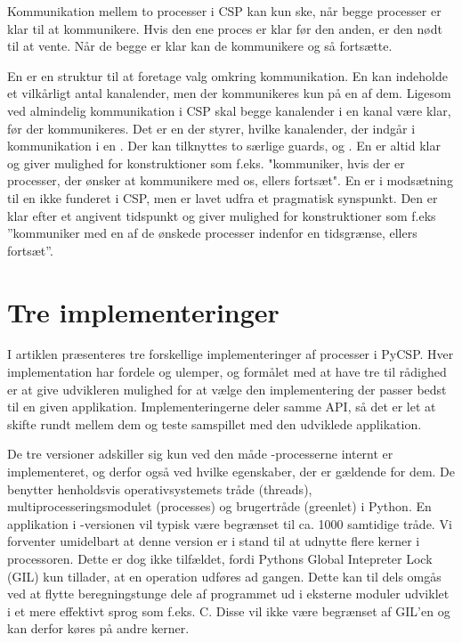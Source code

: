 Kommunikation mellem to processer i CSP kan kun ske, når begge processer er klar til at kommunikere. Hvis den ene proces er klar før den anden, er den nødt til at vente. Når de begge er klar kan de kommunikere og så fortsætte.

En  er en struktur til at foretage valg omkring kommunikation. En  kan indeholde et vilkårligt antal kanalender, men der kommunikeres kun på en af dem. Ligesom ved almindelig kommunikation i CSP skal begge kanalender i en kanal være klar, før der kommunikeres. Det er en   der styrer, hvilke kanalender, der indgår i kommunikation i en . Der kan tilknyttes to særlige guards,  og . En  er altid klar og giver mulighed for konstruktioner som f.eks. "kommuniker, hvis der er processer, der ønsker at kommunikere med os, ellers fortsæt". En  er i modsætning til en  ikke funderet i CSP, men er lavet udfra et pragmatisk synspunkt. Den er klar efter et angivent tidspunkt og giver mulighed for konstruktioner som f.eks ''kommuniker med en af de ønskede processer indenfor en tidsgrænse, ellers fortsæt''. 

\section{Tre implementeringer}
I artiklen \cite{Friborg2009} præsenteres tre forskellige implementeringer af processer i PyCSP. Hver implementation har fordele og ulemper, og formålet med at have tre til rådighed er at give udvikleren mulighed for at vælge den implementering der passer bedst til en given applikation. Implementeringerne deler samme API, så det er let at skifte rundt mellem dem og teste samspillet med den udviklede applikation. 

De tre versioner adskiller sig kun ved den måde \csp-processerne internt er implementeret, og derfor også ved hvilke egenskaber, der er gældende for dem. De benytter henholdsvis operativsystemets tråde (threads), multiprocesseringsmodulet (processes) og brugertråde (greenlet) i Python. En applikation i -versionen vil typisk være begrænset til ca. 1000 samtidige tråde\cite[3]{Friborg2009}. Vi forventer umidelbart at denne version er i stand til at udnytte flere kerner i processoren. Dette er dog ikke tilfældet, fordi Pythons Global Intepreter Lock (GIL) kun tillader, at en operation udføres ad gangen. Dette kan til dels omgås ved at flytte beregningstunge dele af programmet ud i eksterne moduler udviklet i et mere effektivt sprog som f.eks. C. Disse vil ikke være begrænset af GIL'en og kan derfor køres på andre kerner. 

